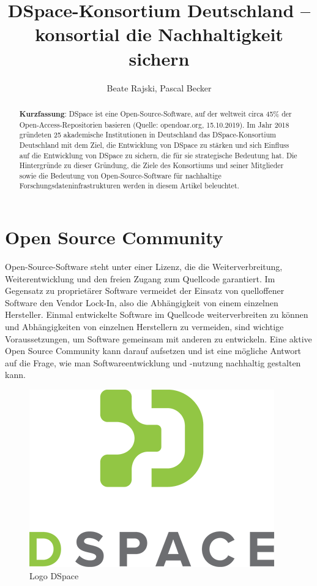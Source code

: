\documentclass[a4paper,
fontsize=11pt,
oneside,
numbers=noperiodatend,
parskip=half-,
bibliography=totoc,
final
]{scrartcl}
\title{\LARGE{DSpace-Konsortium Deutschland -- konsortial die Nachhaltigkeit sichern}} %
\author{Beate Rajski, Pascal Becker} %
\date{}
\begin{document}
\maketitle
\thispagestyle{fancyplain} 

\begin{abstract}
\noindent
\textbf{Kurzfassung}: DSpace ist eine Open-Source-Software, auf der
weltweit circa 45\% der Open-Access-Repositorien basieren (Quelle:
opendoar.org, 15.10.2019). Im Jahr 2018 gründeten 25 akademische
Institutionen in Deutschland das DSpace-Konsortium Deutschland mit dem
Ziel, die Entwicklung von DSpace zu stärken und sich Einfluss auf die
Entwicklung von DSpace zu sichern, die für sie strategische Bedeutung
hat. Die Hintergründe zu dieser Gründung, die Ziele des Konsortiums und
seiner Mitglieder sowie die Bedeutung von Open-Source-Software für
nachhaltige Forschungsdateninfrastrukturen werden in diesem Artikel
beleuchtet.
\end{abstract}

\hypertarget{open-source-community}{%
\section{Open Source Community}\label{open-source-community}}

Open-Source-Software steht unter einer Lizenz, die die
Weiterverbreitung, Weiterentwicklung und den freien Zugang zum Quellcode
garantiert. Im Gegensatz zu proprietärer Software vermeidet der Einsatz
von quelloffener Software den Vendor Lock-In, also die Abhängigkeit von
einem einzelnen Hersteller. Einmal entwickelte Software im Quellcode
weiterverbreiten zu können und Abhängigkeiten von einzelnen Herstellern
zu vermeiden, sind wichtige Voraussetzungen, um Software gemeinsam mit
anderen zu entwickeln. Eine aktive Open Source Community kann darauf
aufsetzen und ist eine mögliche Antwort auf die Frage, wie man
Softwareentwicklung und -nutzung nachhaltig gestalten kann.

\begin{figure}
\centering
\includegraphics{img/DSpace_logo_17_sm.png}
\caption{Logo DSpace}
\end{figure}
\end{document}
